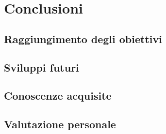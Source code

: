 \chapter{Conclusioni}
\label{cap:conclusioni}

\section{Raggiungimento degli obiettivi}

\section{Sviluppi futuri}

\section{Conoscenze acquisite}

\section{Valutazione personale}
